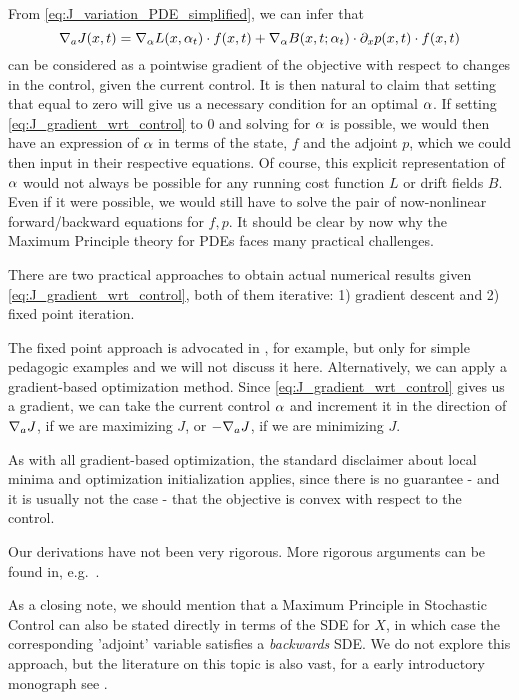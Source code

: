 From \cref{eq:J_variation_PDE_simplified}, we can infer that
\begin{equation}
{ \nabla }_a J(x,t) = { \nabla }_\alpha L(x, \alpha_t) \cdot f(x,t) +
 { \nabla }_\alpha B(x,t;\alpha_t) \cdot {\partial}_xp(x,t) \cdot f(x,t)  
\label{eq:J_gradient_wrt_control}
\end{equation}
can be considered as a pointwise gradient of the objective with respect to
changes in the control, given the current control. It is then natural to claim
that setting that equal to zero will give us a necessary condition for an
optimal $\alpha$.  If setting \cref{eq:J_gradient_wrt_control} to 0 and solving for
$\alpha$ is possible,  we would then  have an expression of $\alpha$ in terms of the
state, $f$ and the adjoint $p$, which we could then input in their respective
equations. Of course, this explicit representation of $\alpha$ would not always be
possible for any running cost function $L$ or drift fields $B$. Even if it were
possible, we  would still have to solve the pair of now-nonlinear
forward/backward equations for $f,p$. It should be clear by now why the Maximum
Principle theory for PDEs faces many practical challenges.

There are two practical approaches to obtain actual numerical results given
\cref{eq:J_gradient_wrt_control}, both of them iterative: 1) gradient
descent and 2) fixed point iteration. 

The fixed point approach is advocated in \cite{Lenhart2007}, for example, but
only for simple pedagogic examples and we will not discuss it here.
Alternatively, we can apply a gradient-based optimization method. Since
\cref{eq:J_gradient_wrt_control} gives us a gradient, we can take the current
control $\alpha$ and increment it in the direction of ${ \nabla }_a J$, if we are
maximizing $J$,  or  $-{ \nabla }_a J$, if we are minimizing $J$.

As with all gradient-based optimization, the standard disclaimer about local
minima and optimization initialization applies, since there is no guarantee -  and
 it is usually not the case - that the objective is convex with respect to the
control. 

Our derivations have not been very rigorous. More rigorous arguments can be
found in, e.g.\ \cite{Fattorini1999,Borzi2012}. 
  
As a closing note, we should mention that a Maximum Principle in Stochastic
Control can also be stated directly in terms of the SDE for $X$, in which
case the corresponding 'adjoint' variable satisfies a {\sl backwards} SDE. We
do not explore this approach, but the literature on this topic is also vast, for a
early introductory monograph see \cite{Haussmann1986}.  
 
